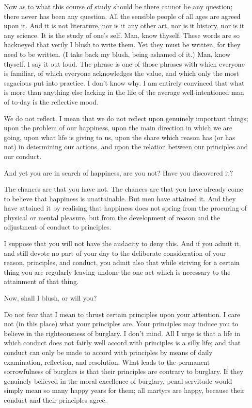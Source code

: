 Now as to what this course of study should be there cannot be any
question; there never has been any question.  All the sensible people
of all ages are agreed upon it.  And it is not literature, nor is it
any other art, nor is it history, nor is it any science. It is the
study of one's self.  Man, know thyself.  These words are so hackneyed
that verily I blush to write them. Yet they must be written, for they
need to be written.  (I take back my blush, being ashamed of it.)  Man,
know thyself.  I say it out loud.  The phrase is one of those phrases
with which everyone is familiar, of which everyone acknowledges the
value, and which only the most sagacious put into practice.  I don't
know why.  I am entirely convinced that what is more than anything else
lacking in the life of the average well-intentioned man of to-day is
the reflective mood.

We do not reflect.  I mean that we do not reflect upon genuinely
important things; upon the problem of our happiness, upon the main
direction in which we are going, upon what life is giving to us, upon
the share which reason has (or has not) in determining our actions, and
upon the relation between our principles and our conduct.

And yet you are in search of happiness, are you not?  Have you
discovered it?

The chances are that you have not.  The chances are that you have
already come to believe that happiness is unattainable.  But men have
attained it. And they have attained it by realising that happiness does
not spring from the procuring of physical or mental pleasure, but from
the development of reason and the adjustment of conduct to principles.

I suppose that you will not have the audacity to deny this.  And if you
admit it, and still devote no part of your day to the deliberate
consideration of your reason, principles, and conduct, you admit also
that while striving for a certain thing you are regularly leaving
undone the one act which is necessary to the attainment of that thing.

Now, shall I blush, or will you?

Do not fear that I mean to thrust certain principles upon your
attention.  I care not (in this place) what your principles are. Your
principles may induce you to believe in the righteousness of burglary.
I don't mind.  All I urge is that a life in which conduct does not
fairly well accord with principles is a silly life; and that conduct
can only be made to accord with principles by means of daily
examination, reflection, and resolution.  What leads to the permanent
sorrowfulness of burglars is that their principles are contrary to
burglary.  If they genuinely believed in the moral excellence of
burglary, penal servitude would simply mean so many happy years for
them; all martyrs are happy, because their conduct and their principles
agree.

